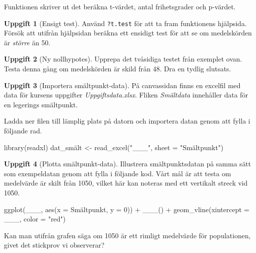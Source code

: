 \documentclass[
]{book}
\newenvironment{Shaded}{\begin{snugshade}}{\end{snugshade}}
\newcommand{\AttributeTok}[1]{\textcolor[rgb]{0.77,0.63,0.00}{#1}}
\newcommand{\DecValTok}[1]{\textcolor[rgb]{0.00,0.00,0.81}{#1}}
\newcommand{\FunctionTok}[1]{\textcolor[rgb]{0.00,0.00,0.00}{#1}}
\newcommand{\NormalTok}[1]{#1}
\newcommand{\OtherTok}[1]{\textcolor[rgb]{0.56,0.35,0.01}{#1}}
\newcommand{\SpecialCharTok}[1]{\textcolor[rgb]{0.00,0.00,0.00}{#1}}
\newcommand{\StringTok}[1]{\textcolor[rgb]{0.31,0.60,0.02}{#1}}
\theoremstyle{definition}
\theoremstyle{definition}
\theoremstyle{definition}
\newtheorem{exercise}{Uppgift}[chapter]
\theoremstyle{definition}
\theoremstyle{remark}
\begin{document}
Funktionen skriver ut det beräkna t-värdet, antal frihetsgrader och p-värdet.

\begin{exercise}[Ensigt test]
Använd \texttt{?t.test} för att ta fram funktionens hjälpsida. Försök att utifrån hjälpsidan beräkna ett ensidigt test för att se om medelskörden är \emph{större} än 50.
\end{exercise}

\begin{exercise}[Ny nollhypotes]
Upprepa det tvåsidiga testet från exemplet ovan. Testa denna gång om medelskörden är skild från 48. Dra en tydlig slutsats.
\end{exercise}

\begin{exercise}[Importera smältpunkt-data]

På canvassidan finns en excelfil med data för kursens uppgifter \emph{Uppgiftsdata.xlsx}. Fliken \emph{Smältdata} innehåller data för en legerings smältpunkt.

Ladda ner filen till lämplig plats på datorn och importera datan genom att fylla i följande rad.

\begin{Shaded}
\begin{Highlighting}[]
\FunctionTok{library}\NormalTok{(readxl)}
\NormalTok{dat\_smält }\OtherTok{\textless{}{-}} \FunctionTok{read\_excel}\NormalTok{(}\StringTok{"\_\_\_"}\NormalTok{, }\AttributeTok{sheet =} \StringTok{"Smältpunkt"}\NormalTok{)}
\end{Highlighting}
\end{Shaded}

\end{exercise}

\begin{exercise}[Plotta smältpunkt-data]
Illustrera smältpunktsdatan på samma sätt som exempeldatan genom att fylla i följande kod. Vårt mål är att testa om medelvärde är skilt från 1050, vilket här kan noteras med ett vertikalt streck vid 1050.

\begin{Shaded}
\begin{Highlighting}[]
\FunctionTok{ggplot}\NormalTok{(\_\_\_, }\FunctionTok{aes}\NormalTok{(}\AttributeTok{x =}\NormalTok{ Smältpunkt, }\AttributeTok{y =} \DecValTok{0}\NormalTok{)) }\SpecialCharTok{+} 
  \FunctionTok{\_\_\_}\NormalTok{() }\SpecialCharTok{+}
  \FunctionTok{geom\_vline}\NormalTok{(}\AttributeTok{xintercept =}\NormalTok{ \_\_\_, }\AttributeTok{color =} \StringTok{"red"}\NormalTok{)}
\end{Highlighting}
\end{Shaded}

Kan man utifrån grafen säga om 1050 är ett rimligt medelvärde för populationen, givet det stickprov vi observerar?
\end{exercise}
\end{document}
